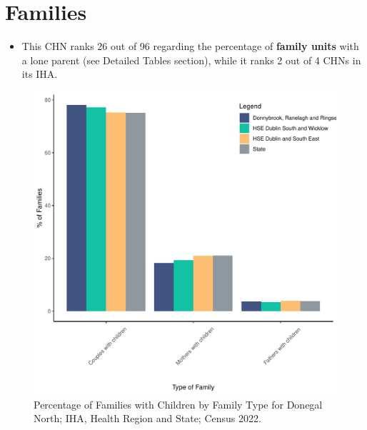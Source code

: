 \documentclass{article}
\begin{document}
\section{Families}\label{sect:Fam}
\begin{itemize}
\item This CHN ranks  26 out of 96 regarding the percentage of \textbf{family units} with a lone parent (see Detailed Tables section), while it ranks   2 out of 4 CHNs in its IHA.
\end{itemize}
\begin{figure}[H]
	\centering
	\includegraphics[width = 150mm]{../figures/FamED.pdf}
	\caption{Percentage of Families with Children by Family Type for Donegal North; IHA, Health Region and State; Census 2022.}
	\label{fig:vbnv}
	\end{figure}
	
\end{document}
